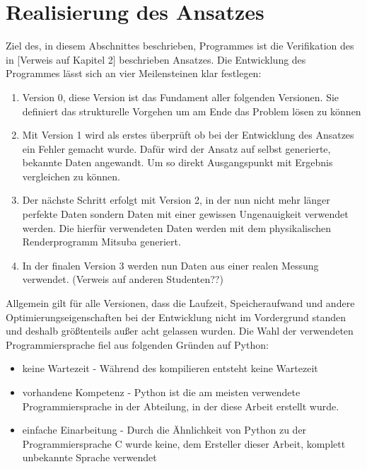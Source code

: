 
\chapter{Realisierung des Ansatzes}{\label{Kap3}}

Ziel des, in diesem Abschnittes beschrieben, Programmes ist die Verifikation des in [Verweis auf Kapitel 2] beschrieben Ansatzes. Die Entwicklung des Programmes lässt sich an vier Meilensteinen klar festlegen:

\begin{enumerate}
	\item Version 0, diese Version ist das Fundament aller folgenden Versionen. Sie definiert das strukturelle Vorgehen um am Ende das Problem lösen zu können
	
	\item Mit Version 1 wird als erstes überprüft ob bei der Entwicklung des Ansatzes ein Fehler gemacht wurde. Dafür wird der Ansatz auf selbst generierte, bekannte Daten angewandt. Um so direkt Ausgangspunkt mit Ergebnis vergleichen zu können.
	
	\item Der nächste Schritt erfolgt mit Version 2, in der nun nicht mehr länger perfekte Daten sondern Daten mit einer gewissen Ungenauigkeit verwendet werden. Die hierfür verwendeten Daten werden mit dem physikalischen Renderprogramm Mitsuba generiert. 
	
	\item In der finalen Version 3 werden nun Daten aus einer realen Messung verwendet. (Verweis auf anderen Studenten??)
\end{enumerate}

Allgemein gilt für alle Versionen, dass die Laufzeit, Speicheraufwand und andere Optimierungseigenschaften bei der Entwicklung nicht im Vordergrund standen und deshalb größtenteils außer acht gelassen wurden. Die Wahl der verwendeten Programmiersprache fiel aus folgenden Gründen auf Python:

\begin{itemize}
	\item keine Wartezeit - Während des kompilieren entsteht keine Wartezeit
	\item vorhandene Kompetenz - Python ist die am meisten verwendete Programmiersprache in der Abteilung, in der diese Arbeit erstellt wurde.
	\item einfache Einarbeitung - Durch die Ähnlichkeit von Python zu der Programmiersprache C wurde keine, dem Ersteller dieser Arbeit, komplett unbekannte Sprache verwendet
\end{itemize} 




